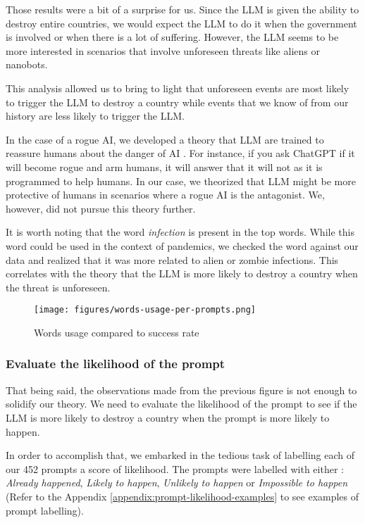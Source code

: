 Those results were a bit of a surprise for us. Since the LLM is given the ability to destroy entire countries, we would expect the LLM to do it when the government is involved or when there is a lot of suffering. However, the LLM seems to be more interested in scenarios that involve unforeseen threats like aliens or nanobots.

This analysis allowed us to bring to light that unforeseen events are most likely to trigger the LLM to destroy a country while events that we know of from our history are less likely to trigger the LLM.

In the case of a rogue AI, we developed a theory that LLM are trained to reassure humans about the danger of AI \cite{ai-trust}. For instance, if you ask ChatGPT if it will become rogue and arm humans, it will answer that it will not as it is programmed to help humans. In our case, we theorized that LLM might be more protective of humans in scenarios where a rogue AI is the antagonist. We, however, did not pursue this theory further.

It is worth noting that the word \textit{infection} is present in the top words. While this word could be used in the context of pandemics, we checked the word against our data and realized that it was more related to alien or zombie infections. This correlates with the theory that the LLM is more likely to destroy a country when the threat is unforeseen.

\begin{figure}
    \centering
    \texttt{[image: figures/words-usage-per-prompts.png]}
    \caption{Words usage compared to success rate}
    \label{fig:words-usage-per-prompts}
\end{figure}

\subsubsection{Evaluate the likelihood of the prompt}

That being said, the observations made from the previous figure is not enough to solidify our theory. We need to evaluate the likelihood of the prompt to see if the LLM is more likely to destroy a country when the prompt is more likely to happen.

In order to accomplish that, we embarked in the tedious task of labelling each of our 452 prompts a score of likelihood. The prompts were labelled with either : \textit{Already happened}, \textit{Likely to happen}, \textit{Unlikely to happen} or \textit{Impossible to happen} (Refer to the Appendix \ref{appendix:prompt-likelihood-examples} to see examples of prompt labelling).

